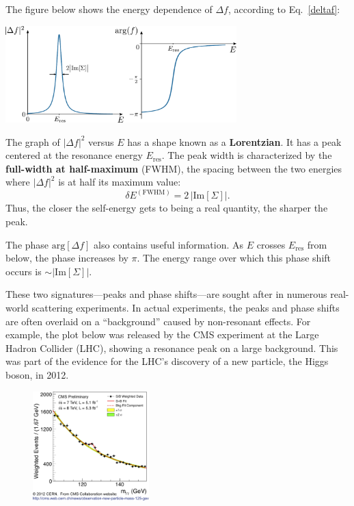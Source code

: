 \documentclass[pra,12pt]{revtex4}
\begin{document}
The figure below shows the energy dependence of $\Delta f$, according
to Eq.~\eqref{deltaf}:

\begin{center}
  \includegraphics[width=0.67\textwidth]{resonance}  
\end{center}

\noindent
The graph of $|\Delta f|^2$ versus $E$ has a shape known as a
\textbf{Lorentzian}.  It has a peak centered at the resonance energy
$E_{\mathrm{res}}$.  The peak width is characterized by the
\textbf{full-width at half-maximum} (FWHM), the spacing between the
two energies where $|\Delta f|^2$ is at half its maximum value:
\begin{equation}
  \delta E^{(\mathrm{FWHM})} = 2\, \Big|\mathrm{Im}[\Sigma]\Big|.
\end{equation}
Thus, the closer the self-energy gets to being a real quantity, the
sharper the peak.

The phase $\mathrm{arg}[\Delta f]$ also contains useful information.
As $E$ crosses $E_{\mathrm{res}}$ from below, the phase increases by
$\pi$.  The energy range over which this phase shift occurs is $\sim
|\mathrm{Im}[\Sigma]|$.

These two signatures---peaks and phase shifts---are sought after in
numerous real-world scattering experiments.  In actual experiments,
the peaks and phase shifts are often overlaid on a ``background''
caused by non-resonant effects.  For example, the plot below was
released by the CMS experiment at the Large Hadron Collider (LHC),
showing a resonance peak on a large background.  This was part of the
evidence for the LHC's discovery of a new particle, the Higgs boson,
in 2012.

\begin{figure}[h]
  \centering\includegraphics[width=0.4\textwidth]{higgs}
\end{figure}
\end{document}

